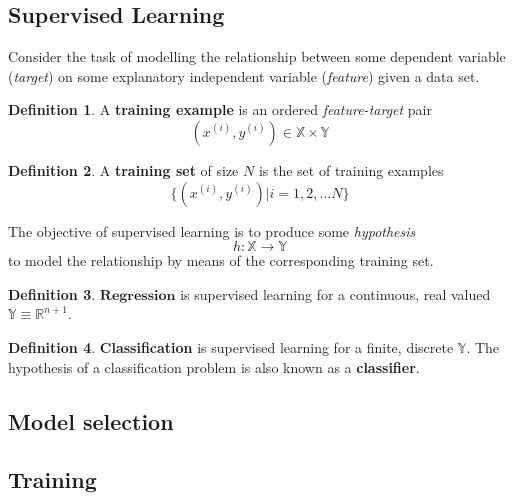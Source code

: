 \documentclass{article}
\theoremstyle{definition}
\newtheorem{definition}{Definition}[section]
\theoremstyle{remark}
\begin{document}
\subsection{Supervised Learning}
Consider the task of modelling the relationship between some dependent variable (\textit{target}) on some explanatory independent variable (\textit{feature}) given a data set.
\begin{definition}
A \textbf{training example} is an ordered \textit{feature-target} pair 
    \begin{equation}
    (x^{(i)}, y^{(i)}) \in \mathbb{X} \times \mathbb{Y}
    \end{equation}
\end{definition}
\begin{definition}
A \textbf{training set} of size $N$ is the set of training examples 
\begin{equation}
    \{(x^{(i)}, y^{(i)})| i = 1, 2, \dots N\}
\end{equation}
\end{definition}
The objective of supervised learning is to produce some \textit{hypothesis} 
\begin{equation}
    h : \mathbb{X} \rightarrow \mathbb{Y}
\end{equation}
to model the relationship by means of the corresponding training set.
\begin{definition}
$\mathbf{Regression}$ is supervised learning for a continuous, real valued $\mathbb{Y} \equiv \mathbb{R}^{n+1}$.
\end{definition}
\begin{definition}
\textbf{Classification} is supervised learning for a finite, discrete $\mathbb{Y}$. The hypothesis of a classification problem is also known as a \textbf{classifier}.
\end{definition}

\subsection{Model selection}
\subsection{Training}
\end{document}
